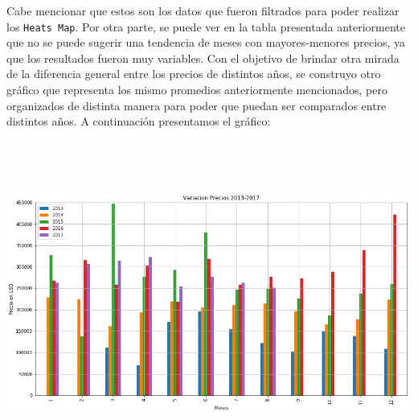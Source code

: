 \documentclass[a4paper, 10pt]{article}
\def\code#1{\texttt{#1}}
\newcommand\tab[1][0.5cm]{\hspace*{#1}}
\begin{document}
        \tab Cabe mencionar que estos son los datos que fueron filtrados para poder realizar los \code{Heats Map}.
        Por otra parte, se puede ver en la tabla presentada anteriormente que no se puede sugerir una tendencia de meses con mayores-menores precios, ya que los resultados fueron muy variables.
        Con el objetivo de brindar otra mirada de la diferencia general entre los precios de distintos años, se construyo otro gráfico que representa los mismo promedios anteriormente mencionados, pero organizados de distinta manera para poder que puedan ser comparados entre distintos años. A continuación presentamos el gráfico:

        \begin{center}
              \includegraphics[width=6in, height=4.2in]{images/comparacionAnual}
        \end{center}
\end{document}

